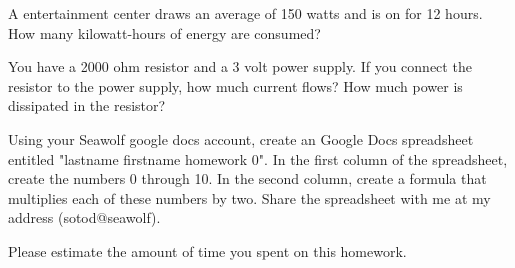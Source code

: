 \documentclass{article}
\begin{document}

A entertainment center draws an average of 150 watts and is on for 12 hours.  How
many kilowatt-hours of energy are consumed?



You have a 2000 ohm resistor and a 3 volt power supply.  If you connect
the resistor to the power supply, how much current flows?  How much
power is dissipated in the resistor?



Using your Seawolf google docs account, create an Google Docs
spreadsheet entitled "lastname firstname homework 0".  In the first
column of the spreadsheet, create the numbers 0 through 10.  In the
second column, create a formula that multiplies each of these numbers by
two.  Share the spreadsheet with me at my address (sotod@seawolf).


Please estimate the amount of time you spent on this homework.
\end{document}
